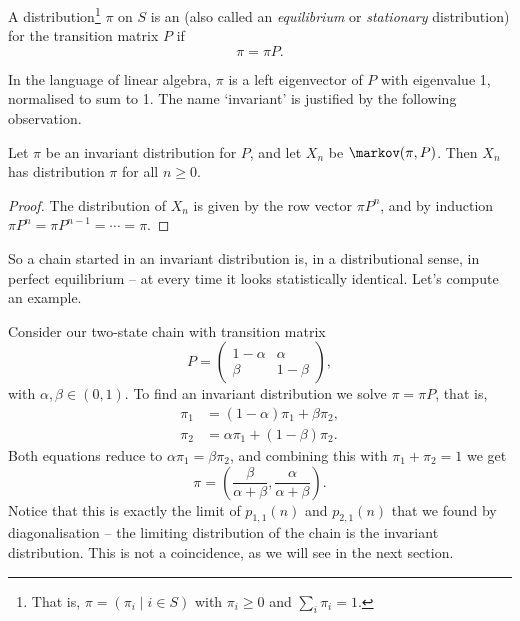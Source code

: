 \begin{definition}
	A distribution\footnote{That is, $\pi = (\pi_i \mid i \in S)$ with $\pi_i \geq 0$ and $\sum_i \pi_i = 1$.} $\pi$ on $S$ is an  (also called an \emph{equilibrium} or \emph{stationary} distribution) for the transition matrix $P$ if
	$$
	\pi = \pi P.
	$$
\end{definition}

In the language of linear algebra, $\pi$ is a left eigenvector of $P$ with eigenvalue 1, normalised to sum to 1. The name `invariant' is justified by the following observation.

\begin{proposition}
	Let $\pi$ be an invariant distribution for $P$, and let $X_n$ be $\markov(\pi, P)$. Then $X_n$ has distribution $\pi$ for all $n \geq 0$.
\end{proposition}
\begin{proof}
	The distribution of $X_n$ is given by the row vector $\pi P^n$, and by induction $\pi P^n = \pi P^{n - 1} = \cdots = \pi$.
\end{proof}

So a chain started in an invariant distribution is, in a distributional sense, in perfect equilibrium -- at every time it looks statistically identical. Let's compute an example.

\begin{example}
	Consider our two-state chain with transition matrix
	$$
	P = \begin{pmatrix}
		1 - \alpha & \alpha \\
		\beta & 1 - \beta
	\end{pmatrix},
	$$
	with $\alpha, \beta \in (0, 1)$. To find an invariant distribution we solve $\pi = \pi P$, that is,
	\begin{align*}
		\pi_1 &= (1 - \alpha)\pi_1 + \beta \pi_2, \\
		\pi_2 &= \alpha \pi_1 + (1 - \beta) \pi_2.
	\end{align*}
	Both equations reduce to $\alpha \pi_1 = \beta \pi_2$, and combining this with $\pi_1 + \pi_2 = 1$ we get
	$$
	\pi = \left(\frac{\beta}{\alpha + \beta}, \frac{\alpha}{\alpha + \beta}\right).
	$$
	Notice that this is exactly the limit of $p_{1, 1}(n)$ and $p_{2, 1}(n)$ that we found by diagonalisation -- the limiting distribution of the chain is the invariant distribution. This is not a coincidence, as we will see in the next section.
\end{example}

